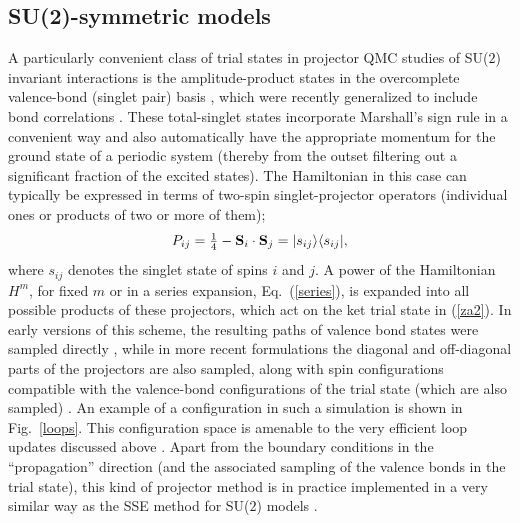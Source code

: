 \documentclass[range]{ar2e}
\begin{document}
\subsection{SU(2)-symmetric models}
\label{su2method}

A particularly convenient class of trial states in projector QMC studies of SU($2$) invariant interactions is the amplitude-product states in the overcomplete
valence-bond (singlet pair) basis \cite{Liang88}, which were recently generalized to include bond correlations \cite{Lin12}. These total-singlet states incorporate 
Marshall's sign rule in a convenient way and also automatically have the appropriate momentum for the ground state of a periodic system (thereby from the outset 
filtering out a significant fraction of the excited states). The Hamiltonian in this case can typically be expressed in terms of 
two-spin singlet-projector operators  (individual ones or products of two or more of them);
\begin{equation}
P_{ij}=\hbox{$\frac{1}{4}$}-{\bf S}_i\cdot {\bf S}_j = |s_{ij}\rangle\langle s_{ij}|,
\label{psinglet}
\end{equation}
where $s_{ij}$ denotes the singlet state of spins $i$ and $j$. A power of the Hamiltonian $H^m$, for fixed $m$ or in a series expansion, Eq.~(\ref{series}),
is expanded into all possible products of these projectors, which act on the ket trial state in (\ref{za2}). In early versions of this scheme, the resulting 
paths of valence bond states were sampled directly \cite{Liang90,Santoro99,Sandvik05}, while in more recent formulations the diagonal and off-diagonal parts of the 
projectors are also sampled, along with spin configurations compatible with the valence-bond configurations of the trial state (which are also sampled) 
\cite{Sandvik10c}. An example of a configuration in such a simulation is shown in Fig.~\ref{loops}. This configuration space is amenable to the very efficient 
loop updates discussed above \cite{Sandvik10a}. Apart from the boundary conditions in the ``propagation'' direction (and the associated sampling of the
valence bonds in the trial state), this kind of projector method is in practice implemented in a very similar way as the SSE method for SU($2$) 
models \cite{Sandvik10b}.
\end{document}
